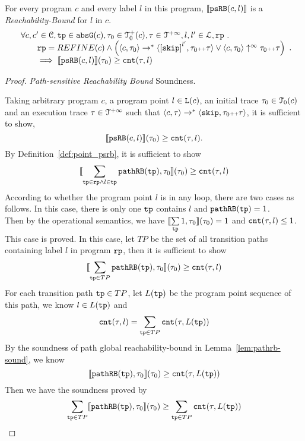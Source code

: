 \begin{theorem}
For every program ${c}$ and every label $l$ in this program,
$\llbracket \mathtt{psRB}(c, l) \rrbracket$ is a \emph{Reachability-Bound} for $l$ in $c$.
%
\[
  \begin{array}{l}
    \forall c, c' \in \cdom, \tpath \in \absG(c), \trace_0 \in \ftdom_0(c), \trace \in \tdom, l, l' \in \ldom, \rprog \st 
    \\ \qquad
    \rprog = REFINE(c) 
    \land
    \Big(
    \config{c, \trace_0} \rightarrow^* \config{\clabel{\eskip}^{l'}, \trace_0 \tracecat \trace}
    \lor \config{c, \trace_0} \uparrow^{\infty} \trace_0 \tracecat \trace 
    \Big)
    \\ \qquad
    \implies \econfig{\psRB(c, l)}(\trace_0) \geq \counter(\trace, l)
  \end{array}.
\]
\end{theorem}
%
\begin{proof} \emph{Path-sensitive Reachability Bound} Soundness.

    Taking arbitrary program $c$, a program point $l \in \mathtt{L}(c)$, an initial trace $\mathtt{\tau}_0 \in \mathcal{T}_0(c)$ and an execution trace $\mathtt{\tau} \in \mathcal{T}^{+\infty}$
    such that $\langle {c}, \mathtt{\tau} \rangle \to^{*} \langle \mathtt{skip}, \mathtt{\tau}_0 {\scriptscriptstyle ++} \mathtt{\tau} \rangle$,
    it is sufficient to show,
    \[
    \llbracket \mathtt{psRB}(c, l) \rrbracket(\mathtt{\tau}_0) \geq \mathtt{cnt}(\mathtt{\tau}, l) .
    \]
    By Definition~\ref{def:point_psrb}, it is sufficient to show 
    \[
    \llbracket \sum\limits_{\mathtt{tp} \in \mathtt{rp} \land  l \in \mathtt{tp}} \mathtt{pathRB}(\mathtt{tp}), \mathtt{\tau}_0 \rrbracket(\mathtt{\tau}_0)  \geq  \mathtt{cnt}(\mathtt{\tau}, l)
    \]
    According to whether the program point $l$ is in any loop, there are two cases as follows.
    In this case, there is only one $\mathtt{tp}$ contains $l$ and $\mathtt{pathRB}(\mathtt{tp}) = 1$.
    \\
    Then by the operational semantics, we have $\llbracket \sum\limits_{\mathtt{tp}} 1, \mathtt{\tau}_0 \rrbracket(\mathtt{\tau}_0) =  1$ and $ \mathtt{cnt}(\mathtt{\tau}, l) \leq 1$.
    \\
    This case is proved.
    In this case, let $TP$ be the set of all transition paths containing 
    label $l$ in program $\mathtt{rp}$, then it is sufficient to show 
    \[
        \llbracket \sum\limits_{\mathtt{tp} \in TP} \mathtt{pathRB}(\mathtt{tp}), \mathtt{\tau}_0 \rrbracket(\mathtt{\tau}_0)  \geq  \mathtt{cnt}(\mathtt{\tau}, l)
    \]
    For each transition path $\mathtt{tp} \in TP$, let $L(\mathtt{tp})$ be the program point sequence of this path, we know $l \in L(\mathtt{tp})$
    and 
    \[
        \mathtt{cnt}(\mathtt{\tau}, l) = \sum\limits_{\mathtt{tp} \in TP} \mathtt{cnt}(\mathtt{\tau}, L(\mathtt{tp}))
    \]
    By the soundness of path global reachability-bound in Lemma~\ref{lem:pathrb-sound}, we know
    \[
        \llbracket \mathtt{pathRB}(\mathtt{tp}), \mathtt{\tau}_0 \rrbracket(\mathtt{\tau}_0)  \geq  \mathtt{cnt}(\mathtt{\tau}, L(\mathtt{tp}))
    \]
    Then we have the soundness proved by
    \[
        \sum\limits_{\mathtt{tp} \in TP} \llbracket \mathtt{pathRB}(\mathtt{tp}), \mathtt{\tau}_0 \rrbracket(\mathtt{\tau}_0)  \geq \sum\limits_{\mathtt{tp} \in TP}  \mathtt{cnt}(\mathtt{\tau}, L(\mathtt{tp}))
    \]
\end{proof}
  
